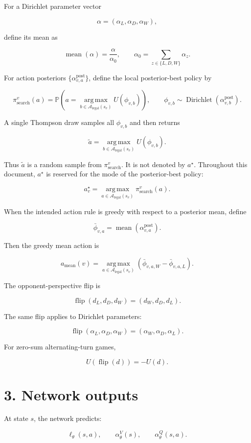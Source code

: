 \documentclass[11pt]{article}
\newcommand{\Prob}{\mathbb{P}}
\newcommand{\Dir}{\operatorname{Dirichlet}}
\newcommand{\argmax}{\operatorname*{arg\,max}}
\newcommand{\mean}{\operatorname{mean}}
\newcommand{\Legal}{\mathcal{A}_{\mathrm{legal}}}
\newcommand{\Flip}{\operatorname{flip}}
\newcommand{\Utility}{U}
\begin{document}
For a Dirichlet parameter vector

\[
\alpha = (\alpha_L,\alpha_D,\alpha_W),
\]

define its mean as

\[
\mean(\alpha)
=
\frac{\alpha}{\alpha_0},
\qquad
\alpha_0 = \sum_{z \in \{L,D,W\}} \alpha_z.
\]

For action posteriors \(\{\alpha^{\mathrm{post}}_{v,a}\}\), define the local
posterior-best policy by

\[
\pi_{\mathrm{search}}^v(a)
=
\Prob
\left(
  a=
  \argmax_{b\in\Legal(s_v)}
  \Utility(\phi_{v,b})
\right),
\qquad
\phi_{v,b}\sim\Dir(\alpha^{\mathrm{post}}_{v,b}).
\]

A single Thompson draw samples all \(\phi_{v,b}\) and then returns

\[
\tilde a
=
\argmax_{b\in\Legal(s_v)}
\Utility(\phi_{v,b}).
\]

Thus \(\tilde a\) is a random sample from \(\pi_{\mathrm{search}}^v\). It is
not denoted by \(a^\star\). Throughout this document, \(a^\star\) is reserved
for the mode of the posterior-best policy:

\[
a^\star_v
=
\argmax_{a\in\Legal(s_v)}
\pi_{\mathrm{search}}^v(a).
\]

When the intended action rule is greedy with respect to a posterior mean, define

\[
\bar\phi_{v,a}
=
\mean
\left(
\alpha^{\mathrm{post}}_{v,a}
\right).
\]

Then the greedy mean action is

\[
a_{\mathrm{mean}}(v)
=
\argmax_{a\in\Legal(s_v)}
\left(
\bar\phi_{v,a,W}-\bar\phi_{v,a,L}
\right).
\]

The opponent-perspective flip is

\[
\Flip(d_L,d_D,d_W)
=
(d_W,d_D,d_L).
\]

The same flip applies to Dirichlet parameters:

\[
\Flip(\alpha_L,\alpha_D,\alpha_W)
=
(\alpha_W,\alpha_D,\alpha_L).
\]

For zero-sum alternating-turn games,

\[
\Utility(\Flip(d)) = -\Utility(d).
\]

\section*{3. Network outputs}

At state \(s\), the network predicts:

\[
\ell_\theta(s,a),
\qquad
\alpha_\theta^V(s),
\qquad
\alpha_\theta^Q(s,a).
\]
\end{document}
